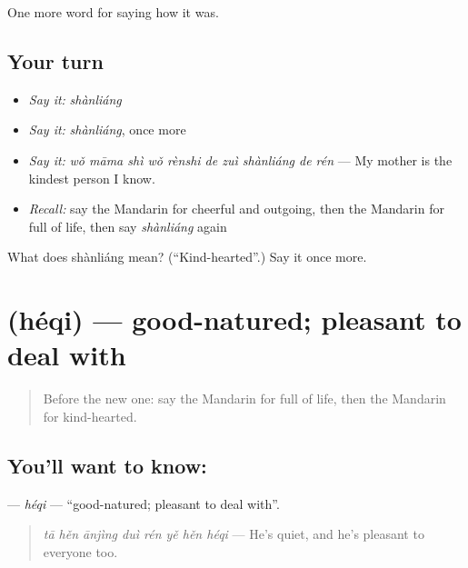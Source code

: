 \begin{grammarlens}[title={What you've built}]
One more word for saying how it was.
\end{grammarlens}

\subsection*{Your turn}
\begin{itemize}
\raggedright
  \item \emph{Say it:} \emph{shànliáng}
  \item \emph{Say it:} \emph{shànliáng}, once more
  \item \emph{Say it:} \emph{wǒ māma shì wǒ rènshi de zuì shànliáng de rén} — My mother is the kindest person I know.
  \item \emph{Recall:} say the Mandarin for cheerful and outgoing, then the Mandarin for full of life, then say \emph{shànliáng} again
\end{itemize}

\begin{tcolorbox}[breakable,colback=teal!4,colframe=teal!35!black,title={Before you move on}]
What does shànliáng mean? (\textquotedblleft{}Kind-hearted\textquotedblright{}.) Say it once more.
\end{tcolorbox}
\section[\texorpdfstring{\zh{和气} (héqi)}{和气 (héqi)}]{ (héqi) — good-natured; pleasant to deal with}

\label{lesson:ZH-C468-heqi}



\begin{quote}
Before the new one: say the Mandarin for full of life, then the Mandarin for kind-hearted.
\end{quote}

\subsection*{You'll want to know: }
\textbf{} — \emph{héqi} — \textquotedblleft{}good-natured; pleasant to deal with\textquotedblright{}.

\begin{quote}
\textbf{} \emph{tā hěn ānjìng duì rén yě hěn héqi} — He's quiet, and he's pleasant to everyone too.
\end{quote}

